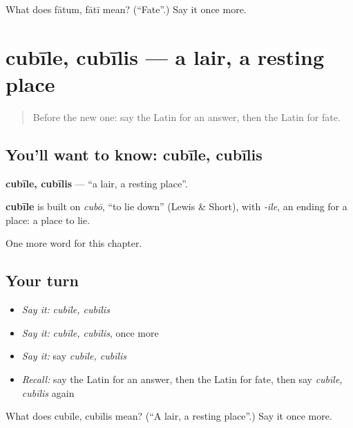 \begin{tcolorbox}[breakable,colback=teal!4,colframe=teal!35!black,title={Before you move on}]
What does fātum, fātī mean? (\textquotedblleft{}Fate\textquotedblright{}.) Say it once more.
\end{tcolorbox}
\section[cubīle, cubīlis]{cubīle, cubīlis — a lair, a resting place}

\label{lesson:LA-C227-cubile}



\begin{quote}
Before the new one: say the Latin for an answer, then the Latin for fate.
\end{quote}

\subsection*{You'll want to know: cubīle, cubīlis}
\textbf{cubīle, cubīlis} — \textquotedblleft{}a lair, a resting place\textquotedblright{}.

\begin{cousinweb}
\textbf{cubīle} is built on \emph{cubō}, \textquotedblleft{}to lie down\textquotedblright{} (Lewis \& Short), with \emph{-īle}, an ending for a place: a place to lie.
\end{cousinweb}

\begin{grammarlens}[title={What you've built}]
One more word for this chapter.
\end{grammarlens}

\subsection*{Your turn}
\begin{itemize}
\raggedright
  \item \emph{Say it:} \emph{cubīle, cubīlis}
  \item \emph{Say it:} \emph{cubīle, cubīlis}, once more
  \item \emph{Say it:} say \emph{cubīle, cubīlis}
  \item \emph{Recall:} say the Latin for an answer, then the Latin for fate, then say \emph{cubīle, cubīlis} again
\end{itemize}

\begin{tcolorbox}[breakable,colback=teal!4,colframe=teal!35!black,title={Before you move on}]
What does cubīle, cubīlis mean? (\textquotedblleft{}A lair, a resting place\textquotedblright{}.) Say it once more.
\end{tcolorbox}
